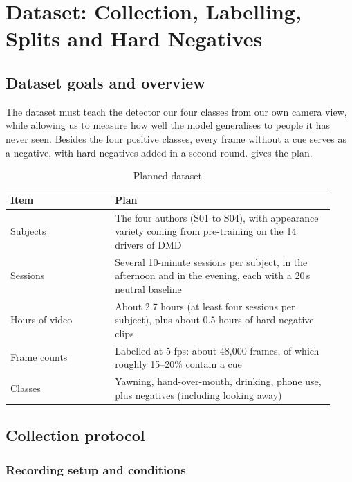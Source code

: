 \section{Dataset: Collection, Labelling, Splits and Hard Negatives}
\label{sec:dataset}
\subsection{Dataset goals and overview}

The dataset must teach the detector our four classes from our own camera view, while allowing us to measure how well the model generalises to people it has never seen. Besides the four positive classes, every frame without a cue serves as a negative, with hard negatives added in a second round.  gives the plan.

\begin{table}[htbp]
\centering
\caption{Planned dataset}
\label{tab:ch5-01}
\footnotesize
\setlength{\tabcolsep}{3pt}
\renewcommand{\arraystretch}{1.15}
\begin{tabular}{|p{0.300\linewidth}|p{0.630\linewidth}|}
\hline
\textbf{Item} & \textbf{Plan} \\
\hline
Subjects & The four authors (S01 to S04), with appearance variety coming from pre-training on the 14 drivers of DMD \\
\hline
Sessions & Several 10-minute sessions per subject, in the afternoon and in the evening, each with a 20\,s neutral baseline \\
\hline
Hours of video & About 2.7 hours (at least four sessions per subject), plus about 0.5 hours of hard-negative clips \\
\hline
Frame counts & Labelled at 5 \gls{fps}: about 48{,}000 frames, of which roughly 15--20\% contain a cue \\
\hline
Classes & Yawning, hand-over-mouth, drinking, phone use, plus negatives (including looking away) \\
\hline
\end{tabular}
\end{table}

\subsection{Collection protocol}
\subsubsection{Recording setup and conditions}

